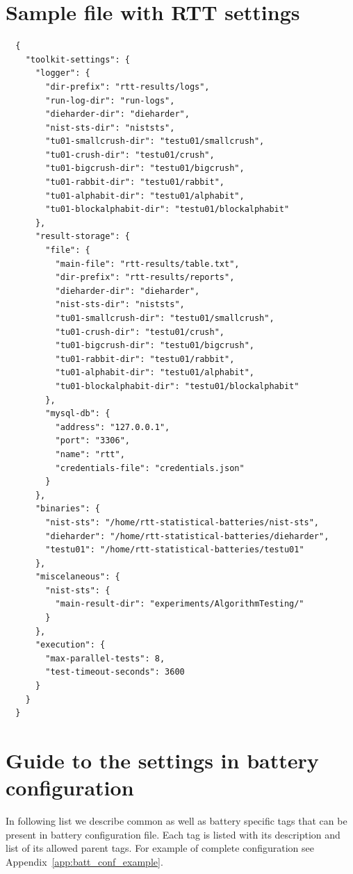 \documentclass[
  digital,  	%
  color,		%
  oneside,   	%
  12pt,
  nocover,
  notable,
  nolof,
  nolot,
]{fithesis3}
\begin{document}
\chapter{Sample file with RTT settings}
\label{app:rtt_sett_json}
\begin{verbatim}
  {
    "toolkit-settings": {
      "logger": {
        "dir-prefix": "rtt-results/logs",
        "run-log-dir": "run-logs",
        "dieharder-dir": "dieharder",
        "nist-sts-dir": "niststs",
        "tu01-smallcrush-dir": "testu01/smallcrush",
        "tu01-crush-dir": "testu01/crush",
        "tu01-bigcrush-dir": "testu01/bigcrush",
        "tu01-rabbit-dir": "testu01/rabbit",
        "tu01-alphabit-dir": "testu01/alphabit",
        "tu01-blockalphabit-dir": "testu01/blockalphabit"
      },
      "result-storage": {
        "file": {
          "main-file": "rtt-results/table.txt",
          "dir-prefix": "rtt-results/reports",
          "dieharder-dir": "dieharder",
          "nist-sts-dir": "niststs",
          "tu01-smallcrush-dir": "testu01/smallcrush",
          "tu01-crush-dir": "testu01/crush",
          "tu01-bigcrush-dir": "testu01/bigcrush",
          "tu01-rabbit-dir": "testu01/rabbit",
          "tu01-alphabit-dir": "testu01/alphabit",
          "tu01-blockalphabit-dir": "testu01/blockalphabit"
        },
        "mysql-db": {
          "address": "127.0.0.1",
          "port": "3306",
          "name": "rtt",
          "credentials-file": "credentials.json"
        }
      },
      "binaries": {
        "nist-sts": "/home/rtt-statistical-batteries/nist-sts",
        "dieharder": "/home/rtt-statistical-batteries/dieharder",
        "testu01": "/home/rtt-statistical-batteries/testu01"
      },
      "miscelaneous": {
        "nist-sts": {
          "main-result-dir": "experiments/AlgorithmTesting/"
        }
      },
      "execution": {
        "max-parallel-tests": 8,
        "test-timeout-seconds": 3600
      }
    }
  }
\end{verbatim}

\chapter{Guide to the settings in battery configuration}
\label{app:batt_conf_guide}
In following list we describe common as well as battery specific tags that can be present in battery configuration file. Each tag is listed with its description and list of its allowed parent tags. For example of complete configuration see Appendix~\ref{app:batt_conf_example}.
\end{document}
